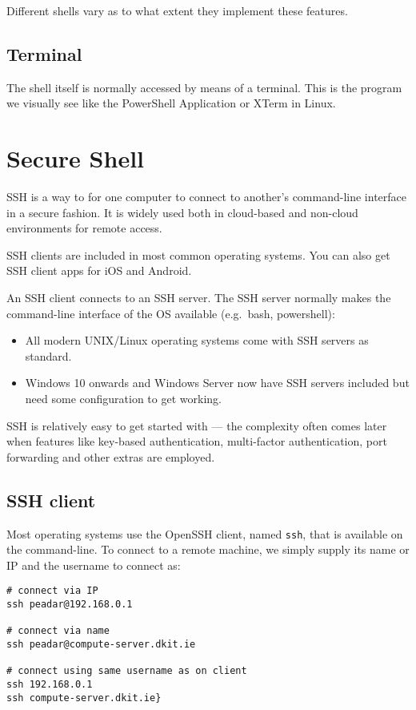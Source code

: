 \documentclass{pgnotes}
\begin{document}
Different shells vary as to what extent they implement these features.

\subsection{Terminal}

The shell itself is normally accessed by means of a terminal.
This is the program we visually see like the PowerShell Application or XTerm in Linux.

\section{Secure Shell}

SSH is a way to for one computer to connect to another's command-line
interface in a secure fashion. It is widely used both in cloud-based and
non-cloud environments for remote access.

SSH clients are included in most common operating systems. You can also
get SSH client apps for iOS and Android.

An SSH client connects to an SSH server.
The SSH server normally makes the command-line interface of the OS available (e.g.~bash, powershell):
\begin{itemize}
\item All modern UNIX/Linux operating systems come with SSH servers as standard.
\item Windows 10 onwards and Windows Server now have SSH servers included but need some configuration to get working.
\end{itemize}
  
SSH is relatively easy to get started with --- the complexity often comes
later when features like key-based authentication, multi-factor
authentication, port forwarding and other extras are employed.

\subsection{SSH client}
\label{ssh-client}

Most operating systems use the OpenSSH client, named \texttt{ssh}, that is available on the command-line.
To connect to a remote machine, we simply supply its name or IP and the username to connect as:

\begin{verbatim}
# connect via IP
ssh peadar@192.168.0.1

# connect via name
ssh peadar@compute-server.dkit.ie

# connect using same username as on client
ssh 192.168.0.1
ssh compute-server.dkit.ie}
\end{verbatim}
\end{document}
